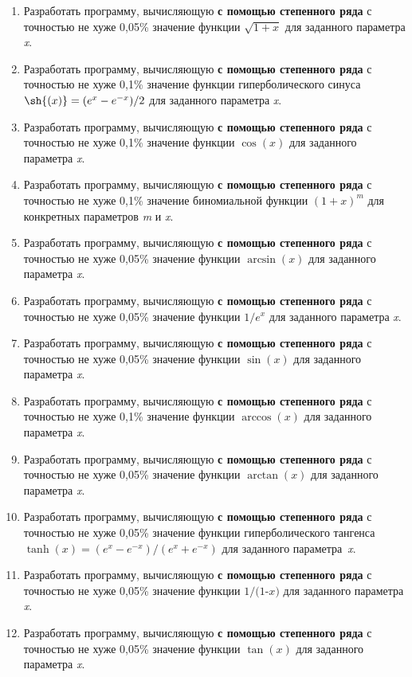 \documentclass[a4paper, 12pt, oneside]{article}
\begin{document}
\begin{enumerate}
    \item Разработать программу, вычисляющую \textbf{с помощью степенного ряда} с точностью не хуже 0,05\% значение функции $\sqrt{1+x}$ для  заданного параметра \textit{x}.
    \item Разработать программу, вычисляющую \textbf{с помощью степенного ряда} с точностью не хуже 0,1\%  значение функции гиперболического синуса $\sh{(x)} = (e^x-e^{-x})/2$ для  заданного параметра \textit{x}.
    \item Разработать программу, вычисляющую \textbf{с помощью степенного ряда} с точностью не хуже 0,1\% значение функции $\cos{(x)}$ для  заданного параметра \textit{x}.
    \item Разработать программу, вычисляющую \textbf{с помощью степенного ряда} с точностью не хуже 0,1\% значение биномиальной функции $(1+x)^{m}$ для конкретных параметров \textit{m} и \textit{x}.
    \item Разработать программу, вычисляющую \textbf{с помощью степенного ряда} с точностью не хуже 0,05\%  значение функции $\arcsin{(x)}$ для  заданного параметра \textit{x}.
    \item Разработать программу, вычисляющую \textbf{с помощью степенного ряда} с точностью не хуже 0,05\%  значение функции $1/e^x$ для  заданного параметра \textit{x}.
    \item Разработать программу, вычисляющую \textbf{с помощью степенного ряда} с точностью не хуже 0,05\% значение функции $\sin{(x)}$ для  заданного параметра \textit{x}.
    \item Разработать программу, вычисляющую \textbf{с помощью степенного ряда} с точностью не хуже 0,1\% значение функции $\arccos(x)$ для  заданного параметра \textit{x}.
    \item Разработать программу, вычисляющую \textbf{с помощью степенного ряда} с точностью не хуже 0,05\% значение функции $\arctan{(x)}$ для  заданного параметра \textit{x}.
	\item Разработать программу, вычисляющую \textbf{с помощью степенного ряда} с точностью не хуже 0,05\% значение функции гиперболического тангенса $\tanh(x)=(e^x-e^{-x})/(e^x+e^{-x})$ для  заданного параметра~\textit{x}.
	\item Разработать программу, вычисляющую \textbf{с помощью степенного ряда} с точностью не хуже 0,05\% значение функции $\textit{1/(1-x)}$ для  заданного параметра \textit{x}.
	\item Разработать программу, вычисляющую \textbf{с помощью степенного ряда} с точностью не хуже 0,05\% значение функции $\tan(x)$ для  заданного параметра \textit{x}.

\end{enumerate}
\end{document}
